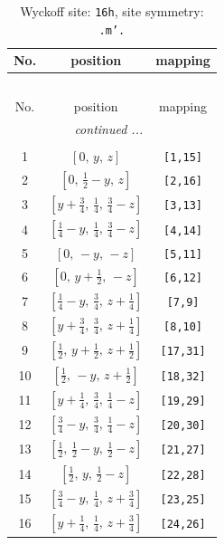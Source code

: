 \documentclass[fleqn,8pt]{jsarticle}
\begin{document}
\renewcommand{\arraystretch}{1.2}
\begin{longtable}{ccc}
\caption{Wyckoff site: {\tt 16h}, site symmetry: {\tt .m'.}}
 \\
 \hline \hline
No. & position & mapping \\ \hline \endfirsthead

\multicolumn{2}{l}{\tablename\ \thetable{}} \\
 \hline \hline
No. & position & mapping \\ \hline \endhead

 \hline \hline
\multicolumn{2}{r}{\footnotesize\it continued ...} \\ \endfoot

 \hline \hline
\multicolumn{2}{r}{} \\ \endlastfoot

1 & $\left[ 0,\, y,\, z \right]$ & {\tt [1,15]} \\ \hline
2 & $\left[ 0,\, \frac{1}{2} - y,\, z \right]$ & {\tt [2,16]} \\ \hline
3 & $\left[ y + \frac{3}{4},\, \frac{1}{4},\, \frac{3}{4} - z \right]$ & {\tt [3,13]} \\ \hline
4 & $\left[ \frac{1}{4} - y,\, \frac{1}{4},\, \frac{3}{4} - z \right]$ & {\tt [4,14]} \\ \hline
5 & $\left[ 0,\, - y,\, - z \right]$ & {\tt [5,11]} \\ \hline
6 & $\left[ 0,\, y + \frac{1}{2},\, - z \right]$ & {\tt [6,12]} \\ \hline
7 & $\left[ \frac{1}{4} - y,\, \frac{3}{4},\, z + \frac{1}{4} \right]$ & {\tt [7,9]} \\ \hline
8 & $\left[ y + \frac{3}{4},\, \frac{3}{4},\, z + \frac{1}{4} \right]$ & {\tt [8,10]} \\ \hline
9 & $\left[ \frac{1}{2},\, y + \frac{1}{2},\, z + \frac{1}{2} \right]$ & {\tt [17,31]} \\ \hline
10 & $\left[ \frac{1}{2},\, - y,\, z + \frac{1}{2} \right]$ & {\tt [18,32]} \\ \hline
11 & $\left[ y + \frac{1}{4},\, \frac{3}{4},\, \frac{1}{4} - z \right]$ & {\tt [19,29]} \\ \hline
12 & $\left[ \frac{3}{4} - y,\, \frac{3}{4},\, \frac{1}{4} - z \right]$ & {\tt [20,30]} \\ \hline
13 & $\left[ \frac{1}{2},\, \frac{1}{2} - y,\, \frac{1}{2} - z \right]$ & {\tt [21,27]} \\ \hline
14 & $\left[ \frac{1}{2},\, y,\, \frac{1}{2} - z \right]$ & {\tt [22,28]} \\ \hline
15 & $\left[ \frac{3}{4} - y,\, \frac{1}{4},\, z + \frac{3}{4} \right]$ & {\tt [23,25]} \\ \hline
16 & $\left[ y + \frac{1}{4},\, \frac{1}{4},\, z + \frac{3}{4} \right]$ & {\tt [24,26]} \\
\end{longtable}
\end{document}
